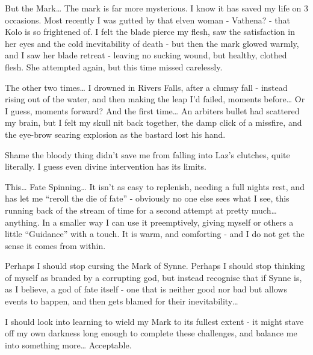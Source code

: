 But the Mark… The mark is far more mysterious. I know it has saved my life on 3 occasions. Most recently I was gutted by that elven woman - Vathena? - that Kolo is so frightened of. I felt the blade pierce my flesh, saw the satisfaction in her eyes and the cold inevitability of death - but then the mark glowed warmly, and I saw her blade retreat - leaving no sucking wound, but healthy, clothed flesh. She attempted again, but this time missed carelessly.\medskip

The other two times… I drowned in Rivers Falls, after a clumsy fall - instead rising out of the water, and then making the leap I’d failed, moments before… Or I guess, moments forward? And the first time… An arbiters bullet had scattered my brain, but I felt my skull nit back together, the damp click of a missfire, and the eye-brow searing explosion as the bastard lost his hand.\medskip

Shame the bloody thing didn’t save me from falling into Laz’s clutches, quite literally. I guess even divine intervention has its limits.\medskip

This… Fate Spinning… It isn’t as easy to replenish, needing a full nights rest, and has let me “reroll the die of fate” - obviously no one else sees what I see, this running back of the stream of time for a second attempt at pretty much… anything. In a smaller way I can use it preemptively, giving myself or others a little “Guidance” with a touch. It is warm, and comforting - and I do not get the sense it comes from within.\medskip

Perhaps I should stop cursing the Mark of Synne. Perhaps I should stop thinking of myself as branded by a corrupting god, but instead recognise that if Synne is, as I believe, a god of fate itself - one that is neither good nor bad but allows events to happen, and then gets blamed for their inevitability…\medskip

I should look into learning to wield my Mark to its fullest extent - it might stave off my own darkness long enough to complete these challenges, and balance me into something more… Acceptable.\medskip

\vspace*{5mm}
